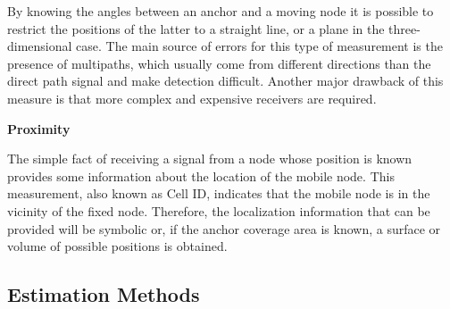 \begin{description}
	By knowing the angles between an anchor and a moving node it is possible to restrict the positions of the latter to a straight line, or a plane in the three-dimensional case.
	The main source of errors  for this type of measurement is the presence of multipaths, which usually come from different directions than the direct path signal and make detection difficult.
	Another major drawback of this measure is that more complex and expensive receivers are required.
	\item \textbf{Proximity}	

	The simple fact of receiving a signal from a node whose position is known provides some information about the location of the mobile node.
	This measurement, also known as Cell ID, indicates that the mobile node is in the vicinity of the fixed node. 
	Therefore, the localization information that can be provided will be symbolic or, if the anchor coverage area is known, a surface or volume of possible positions is obtained.
\end{description}
\subsection{Estimation Methods}
\label{sec:2_2_2_techniques}

